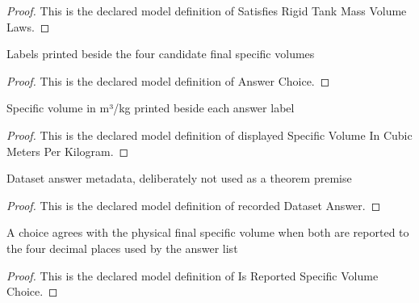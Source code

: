 \begin{proof}
  This is the declared model definition of Satisfies Rigid Tank Mass Volume Laws.
\end{proof}
\begin{definition}
  \label{def:physics:phyx-mini-0397:phyxminiproblems-problemphyxmini0397-answerchoice}
  Labels printed beside the four candidate final specific volumes
\end{definition}
\begin{proof}
  This is the declared model definition of Answer Choice.
\end{proof}
\begin{definition}
  \label{def:physics:phyx-mini-0397:phyxminiproblems-problemphyxmini0397-displayedspecificvolumeincubicmetersperkilogram}
  Specific volume in m³/kg printed beside each answer label
\end{definition}
\begin{proof}
  This is the declared model definition of displayed Specific Volume In Cubic Meters Per Kilogram.
\end{proof}
\begin{definition}
  \label{def:physics:phyx-mini-0397:phyxminiproblems-problemphyxmini0397-recordeddatasetanswer}
  Dataset answer metadata, deliberately not used as a theorem premise
\end{definition}
\begin{proof}
  This is the declared model definition of recorded Dataset Answer.
\end{proof}
\begin{definition}
  \label{def:physics:phyx-mini-0397:phyxminiproblems-problemphyxmini0397-isreportedspecificvolumechoice}
  A choice agrees with the physical final specific volume when both are reported to the four decimal places used by the answer list
\end{definition}
\begin{proof}
  This is the declared model definition of Is Reported Specific Volume Choice.
\end{proof}
